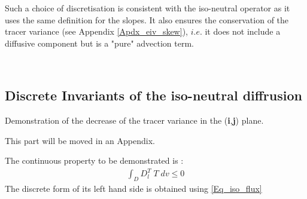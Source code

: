 Such a choice of discretisation is consistent with the iso-neutral operator as it uses the 
same definition for the slopes. It also ensures the conservation of the tracer variance 
(see Appendix \ref{Apdx_eiv_skew}), $i.e.$ it does not include a diffusive component 
but is a "pure" advection term.




$\ $\newpage      %
\subsection{Discrete Invariants of the iso-neutral diffrusion}
\label{Apdx_Gf_operator}

Demonstration of the decrease of the tracer variance in the (\textbf{i},\textbf{j}) plane. 

This part will be moved in an Appendix.

The continuous property to be demonstrated is :
\begin{align*}
\int_D  D_l^T \; T \;dv   \leq 0
\end{align*}
The discrete form of its left hand side is obtained using \eqref{Eq_iso_flux}

